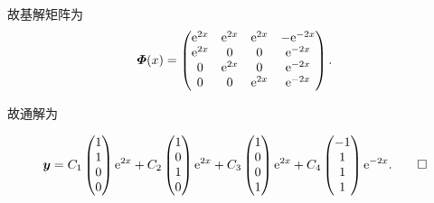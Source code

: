 \begin{solve}
  故基解矩阵为
  \[\bm{\varPhi}(x) = 
  \begin{pmatrix}
    \mathrm{e}^{2x}&\mathrm{e}^{2x}&\mathrm{e}^{2x}&-\mathrm{e}^{-2x} \\
    \mathrm{e}^{2x}&0&0&\mathrm{e}^{-2x} \\
    0&\mathrm{e}^{2x}&0&\mathrm{e}^{-2x} \\
    0&0&\mathrm{e}^{2x}&\mathrm{e}^{-2x}
  \end{pmatrix}.\]

  故通解为

  \[\bm{y} = 
    C_1\begin{pmatrix}1\\1\\0\\0\end{pmatrix}\mathrm{e}^{2x}
    + C_2\begin{pmatrix}1\\0\\1\\0\end{pmatrix}\mathrm{e}^{2x}+C_3\begin{pmatrix}1\\0\\0\\1\end{pmatrix}\mathrm{e}^{2x}
    + C_4\begin{pmatrix}-1\\1\\1\\1\end{pmatrix}\mathrm{e}^{-2x}.\qedhere\]
\end{solve}



